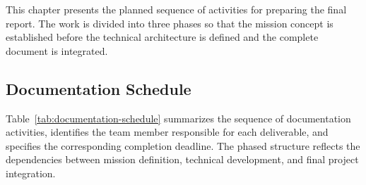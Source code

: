 This chapter presents the planned sequence of activities for preparing the  final report. The work is divided into three phases so that the mission concept is established before the technical architecture is defined and the complete document is integrated.

\subsection{Documentation Schedule}

Table~\ref{tab:documentation-schedule} summarizes the sequence of documentation activities, identifies the team member responsible for each deliverable, and specifies the corresponding completion deadline. The phased structure reflects the dependencies between mission definition, technical development, and final project integration.

\begingroup
\small
\setlength{\parskip}{0pt}
\setlength{\LTpre}{0.5\baselineskip}
\setlength{\LTpost}{0pt}
\renewcommand{\arraystretch}{1.22}
\setlength{\tabcolsep}{5pt}


